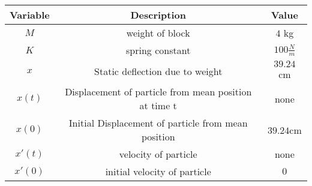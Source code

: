      \begin{tabular}{|c|c|c|} 
      \hline
\textbf{Variable}& \textbf{Description}& \textbf{Value}\\\hline
         $M$& weight of block &$4$ kg\\\hline
          $K$ & spring constant & $100\frac{N}{m}$  \\\hline
          $x$& Static deflection due to weight&$39.24$ cm\\\hline  
          $x(t)$& Displacement of particle from mean position at time t  & none \\\hline
          $x(0)$& Initial Displacement of particle from mean position  & $39.24$cm \\\hline
           $x'(t)$& velocity of particle & none \\\hline
          $x'(0)$& initial velocity of particle & $0$ \\\hline
    \end{tabular}
